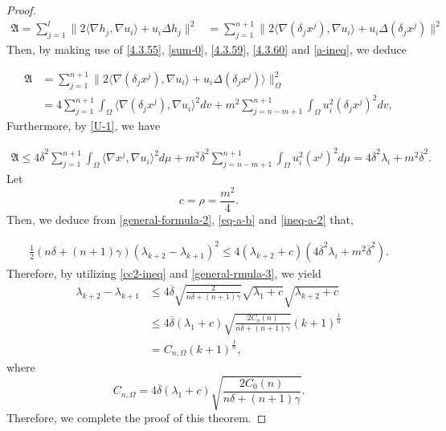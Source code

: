 \documentclass[12pt]{article}
\numberwithin{equation}{section}
\begin{document}
\begin{proof}
\begin{equation}\begin{aligned}\label{a-ineq}\mathfrak{A}=\sum_{j=1}^{l}\|2\langle\nabla h_{j},\nabla u_{i}\rangle+u_{i}\Delta h_{j}\|^{2}
&=\sum_{j=1}^{n+1}\|2\langle\nabla (\delta_{j}x^{j}),\nabla u_{i}\rangle+u_{i}\Delta(\delta_{j}x^{j})\|^{2}\end{aligned}\end{equation}
Then, by making use of \eqref{4.3.55}, \eqref{sum-0}, \eqref{4.3.59}, \eqref{4.3.60} and \eqref{a-ineq}, we deduce

\begin{equation}\label{U-1}\begin{aligned}\mathfrak{A}&=\sum^{n+1}_{j=1} \|2\langle\nabla
(\delta_{j}x^{j}),\nabla u_{i}\rangle+u_{i}\Delta (\delta_{j}x^{j})\rangle\|_{\Omega}^{2}\\
&=4\sum^{n+1}_{j=1}\int_{\Omega}\langle\nabla
(\delta_{j}x^{j}),\nabla
u_{i}\rangle^{2}dv+m^{2}\sum^{n+1}_{j=n-m+1}\int_{\Omega}u_{i}^{2}(\delta_{j}x^{j})^{2}dv
,\end{aligned}\end{equation}
Furthermore, by \eqref{U-1}, we have

\begin{equation}\label{ineq-a-2}\begin{aligned}\mathfrak{A}
\leq4\overline{\delta}^{2}\sum^{n+1}_{j=1}\int_{\Omega}\langle\nabla
x^{j},\nabla
u_{i}\rangle^{2}d\mu+m^{2}\overline{\delta}^{2}\sum^{n+1}_{j=n-m+1}\int_{\Omega}u_{i}^{2}(x^{j})^{2}d\mu=4\overline{\delta}^{2}\lambda_{i}+m^{2}\overline{\delta}^{2}.\end{aligned}\end{equation}
Let $$c=\rho=\frac{m^{2}}{4}.$$Then, we deduce from \eqref{general-formula-2}, \eqref{eq-a-b} and \eqref{ineq-a-2} that,

\begin{equation}\begin{aligned}\label{general-rmula-3}\frac{1}{2}\left(n\delta+(n+1)\gamma\right)\left(\lambda_{k+2}-\lambda_{k+1}\right)^{2}
\leq4(\lambda_{k+2}+c)\left(4\overline{\delta}^{2}\lambda_{i}+m^{2}\overline{\delta}^{2}\right)
.
\end{aligned}\end{equation}Therefore, by utilizing \eqref{cc2-ineq} and \eqref{general-rmula-3}, we yield
\begin{equation*}\begin{aligned}\lambda_{k+2}-\lambda_{k+1}&\leq
4\overline{\delta}\sqrt{\frac{2}{n\delta+(n+1)\gamma}}\sqrt{\lambda_{1}+c}\sqrt{\lambda_{k+2}+c}\\&\leq
4\overline{\delta}\left(\lambda_{1}+c\right)\sqrt{\frac{2C_{0}(n)}{n\delta+(n+1)\gamma}}(k+1)^{\frac{1}{n}}
\\&=C_{n,\Omega}(k+1)^{\frac{1}{n}},\end{aligned}
\end{equation*}
where $$C_{n,\Omega}=4\overline{\delta}\left(\lambda_{1}+c\right)\sqrt{\frac{2C_{0}(n)}{n\delta+(n+1)\gamma}}.$$ Therefore, we complete the
proof of this theorem.
\end{proof}
\end{document}
